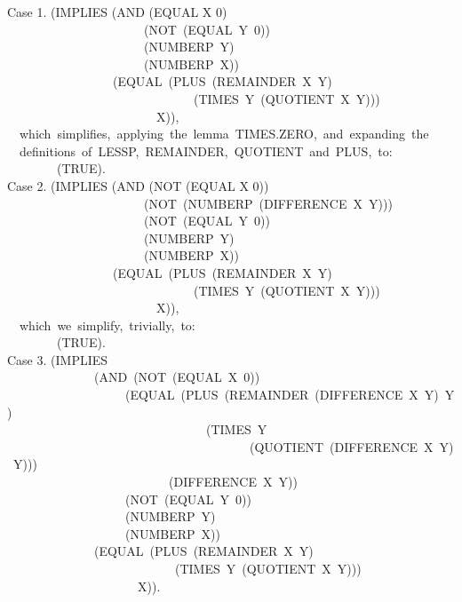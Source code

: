 \documentclass[10pt]{book}
\newenvironment{pubasis}{\begin{flushleft}}{\end{flushleft}}
\begin{document}
\begin{pubasis}
Case 1.	(IMPLIES (AND (EQUAL X 0)\\
~~~~~~~~~~~~~~~~~~~~~~(NOT~(EQUAL~Y~0))\\
~~~~~~~~~~~~~~~~~~~~~~(NUMBERP~Y)\\
~~~~~~~~~~~~~~~~~~~~~~(NUMBERP~X))\\
~~~~~~~~~~~~~~~~~(EQUAL~(PLUS~(REMAINDER~X~Y)\\
~~~~~~~~~~~~~~~~~~~~~~~~~~~~~~(TIMES~Y~(QUOTIENT~X~Y)))\\
~~~~~~~~~~~~~~~~~~~~~~~~X)),\\

~~which~simplifies,~applying~the~lemma~TIMES.ZERO,~and~expanding~the\\
~~definitions~of~LESSP,~REMAINDER,~QUOTIENT~and~PLUS,~to:\\

~~~~~~~~(TRUE).\\

Case 2.	(IMPLIES (AND (NOT (EQUAL X 0))\\
~~~~~~~~~~~~~~~~~~~~~~(NOT~(NUMBERP~(DIFFERENCE~X~Y)))\\
~~~~~~~~~~~~~~~~~~~~~~(NOT~(EQUAL~Y~0))\\
~~~~~~~~~~~~~~~~~~~~~~(NUMBERP~Y)\\
~~~~~~~~~~~~~~~~~~~~~~(NUMBERP~X))\\
~~~~~~~~~~~~~~~~~(EQUAL~(PLUS~(REMAINDER~X~Y)\\
~~~~~~~~~~~~~~~~~~~~~~~~~~~~~~(TIMES~Y~(QUOTIENT~X~Y)))\\
~~~~~~~~~~~~~~~~~~~~~~~~X)),\\

~~which~we~simplify,~trivially,~to:\\

~~~~~~~~(TRUE).\\

Case 3.	(IMPLIES\\
~~~~~~~~~~~~~~(AND~(NOT~(EQUAL~X~0))\\
~~~~~~~~~~~~~~~~~~~(EQUAL~(PLUS~(REMAINDER~(DIFFERENCE~X~Y)~Y)\\
~~~~~~~~~~~~~~~~~~~~~~~~~~~~~~~~(TIMES~Y\\
~~~~~~~~~~~~~~~~~~~~~~~~~~~~~~~~~~~~~~~(QUOTIENT~(DIFFERENCE~X~Y)~Y)))\\
~~~~~~~~~~~~~~~~~~~~~~~~~~(DIFFERENCE~X~Y))\\
~~~~~~~~~~~~~~~~~~~(NOT~(EQUAL~Y~0))\\
~~~~~~~~~~~~~~~~~~~(NUMBERP~Y)\\
~~~~~~~~~~~~~~~~~~~(NUMBERP~X))\\
~~~~~~~~~~~~~~(EQUAL~(PLUS~(REMAINDER~X~Y)\\
~~~~~~~~~~~~~~~~~~~~~~~~~~~(TIMES~Y~(QUOTIENT~X~Y)))\\
~~~~~~~~~~~~~~~~~~~~~X)).\\


\end{pubasis}
\end{document}

